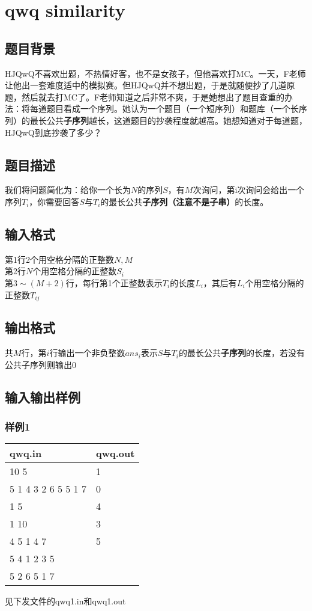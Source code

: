 \documentclass[12pt]{ctexart}
\begin{document}
\newpage
\section{qwq similarity}
\subsection{题目背景}
HJQwQ不喜欢出题，不热情好客，也不是女孩子，但他喜欢打MC。一天，F老师让他出一套难度适中的模拟赛。但HJQwQ并不想出题，于是就随便抄了几道原题，然后就去打MC了。F老师知道之后非常不爽，于是她想出了题目查重的办法：将每道题目看成一个序列。她认为一个题目（一个短序列）和题库（一个长序列）的最长公共\textbf{子序列}越长，这道题目的抄袭程度就越高。她想知道对于每道题，HJQwQ到底抄袭了多少？
\subsection{题目描述}
我们将问题简化为：给你一个长为$N$的序列$S$，有$M$次询问，第i次询问会给出一个序列$T_i$，你需要回答$S$与$T_i$的最长公共\textbf{子序列（注意不是子串）}的长度。
\subsection{输入格式}
\noindent 第1行2个用空格分隔的正整数$N,M$\\
第2行$N$个用空格分隔的正整数$S_i$\\
第$3\sim(M+2)$行，每行第1个正整数表示$T_i$的长度$L_i$，其后有$L_i$个用空格分隔的正整数$T_{ij}$
\subsection{输出格式}
共$M$行，第$i$行输出一个非负整数$ans_i$表示$S$与$T_i$的最长公共\textbf{子序列}的长度，若没有公共子序列则输出0
\subsection{输入输出样例}
\subsubsection{样例1}
\begin{center}
	\begin{tabular}{|p{6cm}|p{6cm}|}
		\hline qwq.in&qwq.out\\
		\hline  10 5&1\\
				5 1 4 3 2 6 5 5 1 7&0\\
				1 5&4\\
				1 10&3\\
				4 5 1 4 7&5\\
				5 4 1 2 3 5&\\
				5 2 6 5 1 7&\\
		\hline
	\end{tabular}
\end{center}
见下发文件的qwq1.in和qwq1.out
\end{document}
